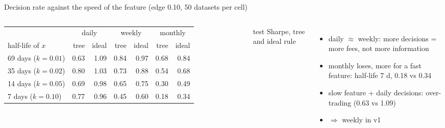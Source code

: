 \documentclass[10pt,aspectratio=169]{beamer}
\newcommand{\1}{\mathbf{1}}
\begin{document}
\begin{frame}{Decision rate against the speed of the feature (edge 0.10, 50 datasets per cell)}
\begin{columns}[T]
\scriptsize\setlength{\tabcolsep}{4pt}
\begin{tabular}{@{}l rr rr rr@{}}
\toprule
& \multicolumn{2}{c}{daily} & \multicolumn{2}{c}{weekly} & \multicolumn{2}{c}{monthly}\\
\cmidrule(lr){2-3}\cmidrule(lr){4-5}\cmidrule(lr){6-7}
half-life of $x$ & tree & ideal & tree & ideal & tree & ideal\\
\midrule
69 days ($k=0.01$) & 0.63 & 1.09 & 0.84 & 0.97 & 0.68 & 0.84\\
35 days ($k=0.02$) & 0.80 & 1.03 & 0.73 & 0.88 & 0.54 & 0.68\\
14 days ($k=0.05$) & 0.69 & 0.98 & 0.65 & 0.75 & 0.30 & 0.49\\
7 days ($k=0.10$) & 0.77 & 0.96 & 0.45 & 0.60 & 0.18 & 0.34\\
\bottomrule
\end{tabular}

\smallskip
test Sharpe, tree and ideal rule
\small
\begin{itemize}
\item daily $\approx$ weekly: more decisions = more fees, not more information
\item monthly loses, more for a fast feature: half-life 7 d, 0.18 vs 0.34
\item slow feature + daily decisions: over-trading (0.63 vs 1.09)
\item $\Rightarrow$ weekly in v1
\end{itemize}
\end{columns}
\end{frame}
\end{document}
